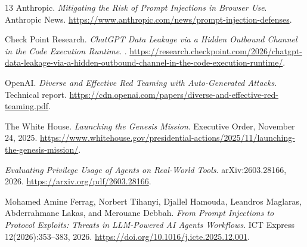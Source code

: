 \documentclass[11pt]{article}
\begin{document}
\begin{thebibliography}{13}
Anthropic.
\newblock \emph{Mitigating the Risk of Prompt Injections in Browser Use}.
\newblock Anthropic News.
\newblock \url{https://www.anthropic.com/news/prompt-injection-defenses}.

Check Point Research.
\newblock \emph{ChatGPT Data Leakage via a Hidden Outbound Channel in the Code Execution Runtime}.
.
\newblock \url{https://research.checkpoint.com/2026/chatgpt-data-leakage-via-a-hidden-outbound-channel-in-the-code-execution-runtime/}.

OpenAI.
\newblock \emph{Diverse and Effective Red Teaming with Auto-Generated Attacks}.
\newblock Technical report.
\newblock \url{https://cdn.openai.com/papers/diverse-and-effective-red-teaming.pdf}.

The White House.
\newblock \emph{Launching the Genesis Mission}.
\newblock Executive Order, November 24, 2025.
\newblock \url{https://www.whitehouse.gov/presidential-actions/2025/11/launching-the-genesis-mission/}.

\emph{Evaluating Privilege Usage of Agents on Real-World Tools}.
\newblock arXiv:2603.28166, 2026.
\newblock \url{https://arxiv.org/pdf/2603.28166}.

Mohamed Amine Ferrag, Norbert Tihanyi, Djallel Hamouda, Leandros Maglaras, Abderrahmane Lakas, and Merouane Debbah.
\newblock \emph{From Prompt Injections to Protocol Exploits: Threats in LLM-Powered AI Agents Workflows}.
\newblock ICT Express 12(2026):353--383, 2026.
\newblock \url{https://doi.org/10.1016/j.icte.2025.12.001}.

\end{thebibliography}
\end{document}

